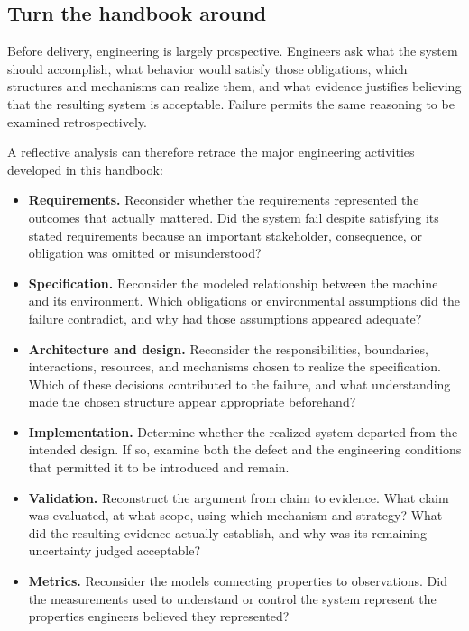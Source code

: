 \subsection{Turn the handbook around}\label{sec-turn-the-handbook-around}

Before delivery, engineering is largely prospective. Engineers ask what the system should
accomplish, what behavior would satisfy those obligations, which structures and mechanisms can
realize them, and what evidence justifies believing that the resulting system is acceptable.
Failure permits the same reasoning to be examined retrospectively.

A reflective analysis can therefore retrace the major engineering activities developed in this
handbook:

\begin{itemize}
\tightlist
\item
  \textbf{Requirements.} Reconsider whether the requirements represented the outcomes that actually
  mattered. Did the system fail despite satisfying its stated requirements because an important
  stakeholder, consequence, or obligation was omitted or misunderstood?
\item
  \textbf{Specification.} Reconsider the modeled relationship between the machine and its environment.
  Which obligations or environmental assumptions did the failure contradict, and why had those
  assumptions appeared adequate?
\item
  \textbf{Architecture and design.} Reconsider the responsibilities, boundaries, interactions,
  resources, and mechanisms chosen to realize the specification. Which of these decisions
  contributed to the failure, and what understanding made the chosen structure appear appropriate
  beforehand?
\item
  \textbf{Implementation.} Determine whether the realized system departed from the intended design. If
  so, examine both the defect and the engineering conditions that permitted it to be introduced and
  remain.
\item
  \textbf{Validation.} Reconstruct the argument from claim to evidence. What claim was evaluated, at
  what scope, using which mechanism and strategy? What did the resulting evidence actually
  establish, and why was its remaining uncertainty judged acceptable?
\item
  \textbf{Metrics.} Reconsider the models connecting properties to observations. Did the measurements
  used to understand or control the system represent the properties engineers believed they
  represented?
\end{itemize}

